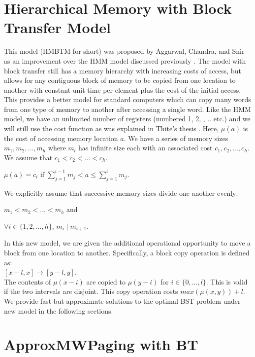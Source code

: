 \documentclass[letterpaper,12pt,titlepage,oneside,final]{book}
\theoremstyle{plain}
\begin{document}
\section{Hierarchical Memory with Block Transfer Model}
This model (HMBTM for short) was proposed by Aggarwal, Chandra, and Snir as an improvement over the HMM model discussed previously \cite{aggarwal1987hierarchical}. The model with block transfer still has a memory hierarchy with increasing costs of access, but allows for any contiguous block of memory to be copied from one location to another with constant unit time per element plus the cost of the initial access. This provides a better model for standard computers which can copy many words from one type of memory to another after accessing a single word. Like the HMM model, we have an unlimited number of registers (numbered 1, 2, , .. etc.) and we will still use the cost function as was explained in Thite's thesis \cite{thite2008optimum}. Here, $\mu (a)$ is the cost of accessing memory location $a$. We have a series of memory sizes $m_1, m_2, ..., m_h$ where $m_l$ has infinite size each with an associated cost $c_1, c_2, ..., c_h$. We assume that $c_1 < c_2 < ... < c_h$. 

\begin{center}$\mu (a) = c_i$ if $\sum_{j = 1}^{i-1}m_j  < a \leq \sum_{j = 1}^{i}m_j$. \end{center}

We explicitly assume that successive memory sizes divide one another evenly:
\begin{center}
$m_1 < m_2 < ... < m_h$ and
\end{center}
\begin{center}
$\forall i \in  \{1,2,...,h\}$, $m_i \mid m_{i+1}$.
\end{center}

In this new model, we are given the additional operational opportunity to move a block from one location to another. Specifically, a block copy operation is defined as: \\
 $[x-l, x] \rightarrow [y-l,y]$. \\
The contents of $\mu(x-i)$ are copied to $\mu(y-i)$ for $i \in \{0,...,l\}$. This is valid if the two intervals are disjoint. This copy operation costs $max(\mu(x,y)) + l$.\\

We provide fast but approximate solutions to the optimal BST problem under new model in the following sections.

\section{ApproxMWPaging with BT}
\end{document}
